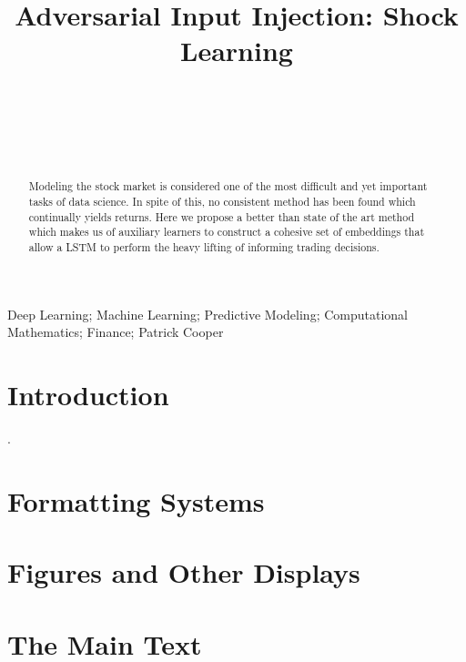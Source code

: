\documentclass{article}
\begin{document}
\title{Adversarial Input Injection: Shock Learning%
%
}

\author{\\[2pt] 
\\
\\
\\
\and
}


\maketitle

\begin{abstract}
Modeling the stock market is considered one of the most difficult and yet important tasks of data science. In spite of this, no consistent method has been found which continually yields returns. Here we propose a better than state of the art method which makes us of auxiliary learners to construct a cohesive set of embeddings that allow a LSTM to perform the heavy lifting of informing trading decisions.
\end{abstract}

\begin{keywords}
Deep Learning; Machine Learning; Predictive Modeling; Computational Mathematics; Finance; Patrick Cooper
\end{keywords}

\section{Introduction}
\label{intro}

\break

\cite{a-review,text-a,text-b}. 

\section{Formatting Systems}

\section{Figures and Other Displays}

\section{The Main Text}
\label{main-text}

\begin{thebibliography}{99}


\end{thebibliography}
\end{document}
